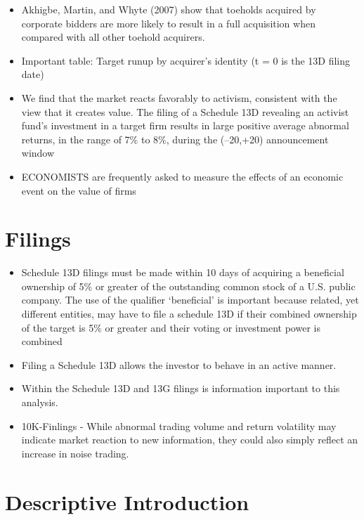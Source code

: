 \documentclass[12pt]{article}
\begin{document}
\begin{itemize}
        \item Akhigbe, Martin, and Whyte (2007) show that toeholds acquired by corporate bidders are more likely to result in a full acquisition when compared with all other toehold acquirers.\citet{Brigida2012}
        \item Important table: Target runup by acquirer's identity (t = 0 is the 13D filing date) \citet{Brigida2012}
        \item We find that the market reacts favorably to activism, consistent with the view that it creates value. The filing of a Schedule 13D revealing an activist fund’s investment in a target firm results in large positive average abnormal returns, in the range
        of 7\% to 8\%, during the (–20,+20) announcement window \citet{Brav2008}
        \item ECONOMISTS are frequently asked to measure the effects of an economic event on the value of firms \citet{MacKinlay1997}

    \end{itemize}

\section{Filings}

\begin{itemize}
    \item Schedule 13D filings must be made within 10 days of acquiring a beneficial ownership of 5\% or greater of the outstanding common stock of a U.S. public company. The use of the qualifier ‘beneficial’ is important because related, yet different entities, may have to file a schedule 13D if their combined ownership of the target is 5\% or greater and their voting or investment power is combined \citet{Brigida2012}
    \item Filing a Schedule 13D allows the investor to behave in an active manner. \citet{Brigida2012}
    \item Within the Schedule 13D and 13G filings is information important to this analysis. \citet{Brigida2012}
    \item 10K-Finlings - While abnormal trading volume and return volatility may indicate market reaction to new information, they could also simply reflect an increase in noise trading. \citet{You2009}
\end{itemize}


\section{Descriptive Introduction}
\end{document}
